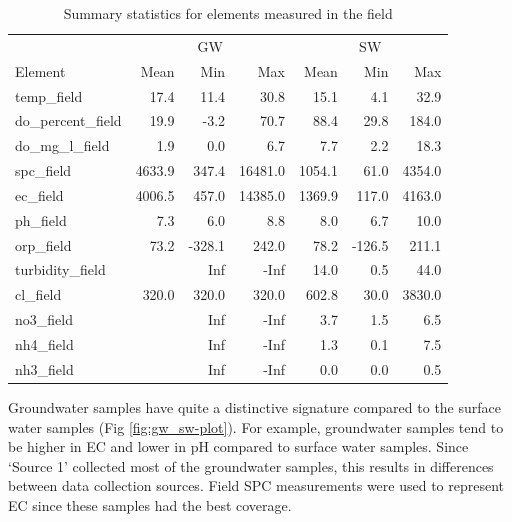 \documentclass[, manuscript]{copernicus}
\begin{document}
\begin{table}
\centering
\caption{\label{tab:TableElementstats}Summary statistics for elements measured in the field}
\centering
\begin{tabular}[t]{l|r|r|r|r|r|r}
\hline
\multicolumn{1}{c|}{} & \multicolumn{3}{c|}{GW} & \multicolumn{3}{c}{SW} \\
\cline{2-4} \cline{5-7}
Element & Mean & Min & Max & Mean & Min & Max\\
\hline
temp\_field & 17.4 & 11.4 & 30.8 & 15.1 & 4.1 & 32.9\\
\hline
do\_percent\_field & 19.9 & -3.2 & 70.7 & 88.4 & 29.8 & 184.0\\
\hline
do\_mg\_l\_field & 1.9 & 0.0 & 6.7 & 7.7 & 2.2 & 18.3\\
\hline
spc\_field & 4633.9 & 347.4 & 16481.0 & 1054.1 & 61.0 & 4354.0\\
\hline
ec\_field & 4006.5 & 457.0 & 14385.0 & 1369.9 & 117.0 & 4163.0\\
\hline
ph\_field & 7.3 & 6.0 & 8.8 & 8.0 & 6.7 & 10.0\\
\hline
orp\_field & 73.2 & -328.1 & 242.0 & 78.2 & -126.5 & 211.1\\
\hline
turbidity\_field &  & Inf & -Inf & 14.0 & 0.5 & 44.0\\
\hline
cl\_field & 320.0 & 320.0 & 320.0 & 602.8 & 30.0 & 3830.0\\
\hline
no3\_field &  & Inf & -Inf & 3.7 & 1.5 & 6.5\\
\hline
nh4\_field &  & Inf & -Inf & 1.3 & 0.1 & 7.5\\
\hline
nh3\_field &  & Inf & -Inf & 0.0 & 0.0 & 0.5\\
\hline
\end{tabular}
\end{table}

Groundwater samples have quite a distinctive signature compared to the
surface water samples (Fig \ref{fig:gw_sw-plot}). For example,
groundwater samples tend to be higher in EC and lower in pH compared to
surface water samples. Since `Source 1' collected most of the
groundwater samples, this results in differences between data collection
sources. Field SPC measurements were used to represent EC since these
samples had the best coverage.

\clearpage
\end{document}
